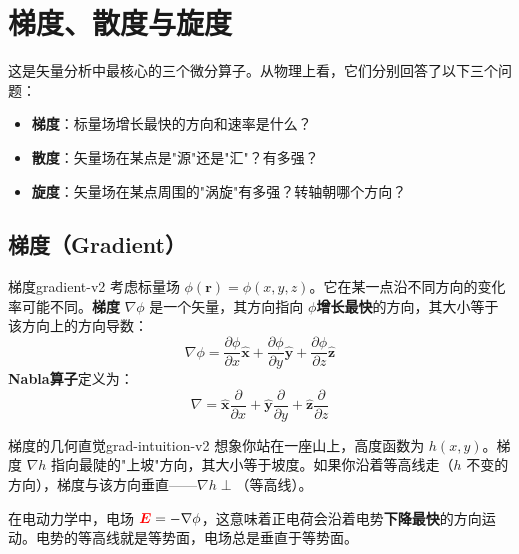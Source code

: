 \documentclass[11pt,a4paper,openany,oneside]{book}
\newcommand{\vecE}{\textcolor{red}{\vect{E}}}
\newcommand{\vect}[1]{\bm{#1}}
\newcommand{\unitvec}[1]{\hat{\vect{#1}}}
\newcommand{\grad}{\nabla}
\begin{document}
\section{梯度、散度与旋度}

这是矢量分析中最核心的三个微分算子。从物理上看，它们分别回答了以下三个问题：
\begin{itemize}
\item \textbf{梯度}：标量场增长最快的方向和速率是什么？
\item \textbf{散度}：矢量场在某点是"源"还是"汇"？有多强？
\item \textbf{旋度}：矢量场在某点周围的"涡旋"有多强？转轴朝哪个方向？
\end{itemize}

\subsection{梯度（Gradient）}

\begin{definition}{梯度}{gradient-v2}
考虑标量场 $\phi(\vect{r}) = \phi(x, y, z)$。它在某一点沿不同方向的变化率可能不同。\textbf{梯度} $\grad\phi$ 是一个矢量，其方向指向 $\phi$\textbf{增长最快}的方向，其大小等于该方向上的方向导数：
\[
\grad\phi = \frac{\partial\phi}{\partial x}\unitvec{x} + \frac{\partial\phi}{\partial y}\unitvec{y} + \frac{\partial\phi}{\partial z}\unitvec{z}
\]
\textbf{Nabla算子}定义为：
\[
\grad = \unitvec{x}\frac{\partial}{\partial x} + \unitvec{y}\frac{\partial}{\partial y} + \unitvec{z}\frac{\partial}{\partial z}
\]
\end{definition}

\begin{insight}{梯度的几何直觉}{grad-intuition-v2}
想象你站在一座山上，高度函数为 $h(x,y)$。梯度 $\grad h$ 指向最陡的"上坡"方向，其大小等于坡度。如果你沿着等高线走（$h$ 不变的方向），梯度与该方向垂直——$\grad h \perp$（等高线）。

在电动力学中，电场 $\vecE = -\grad\phi$，这意味着正电荷会沿着电势\textbf{下降最快}的方向运动。电势的等高线就是等势面，电场总是垂直于等势面。
\end{insight}

\begin{center}
\end{center}
\end{document}
